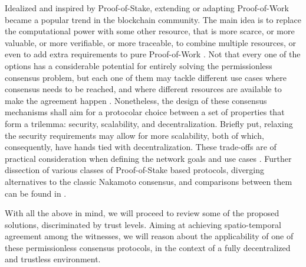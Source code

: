 Idealized and inspired by Proof-of-Stake, extending or adapting Proof-of-Work became a popular trend in the blockchain community. The main idea is to replace the computational power with some other resource, that is more scarce, or more valuable, or more verifiable, or more traceable, to combine multiple resources, or even to add extra requirements to pure Proof-of-Work \cite{survey-dist-consensus}. Not that every one of the options has a considerable potential for entirely solving the permissionless consensus problem, but each one of them may tackle different use cases where consensus needs to be reached, and where different resources are available to make the agreement happen \cite{BOURAGA2021114384, 9376868}. Nonetheless, the design of these consensus mechanisms shall aim for a protocolar choice between a set of properties that form a trilemma: security, scalability, and decentralization. Briefly put, relaxing the security requirements may allow for more scalability, both of which, consequently, have hands tied with decentralization. These trade-offs are of practical consideration when defining the network goals and use cases \cite{survey-dist-consensus}. Further dissection of various classes of Proof-of-Stake based protocols, diverging alternatives to the classic Nakamoto consensus, and comparisons between them can be found in \cite{8629877, survey-dist-consensus, BOURAGA2021114384, 9376868, natoli2019deconstructing}.

With all the above in mind, we will proceed to review some of the proposed \pol{} solutions, discriminated by trust levels. Aiming at achieving spatio-temporal agreement among the witnesses, we will reason about the applicability of one of these permissionless consensus protocols, in the context of a fully decentralized and trustless environment.